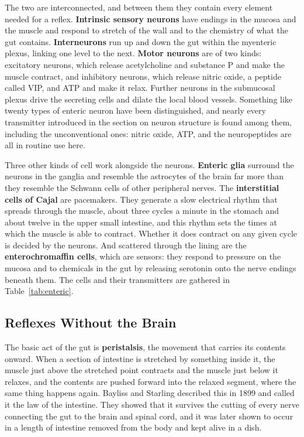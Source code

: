 \documentclass[11pt]{article}
\begin{document}
The two are interconnected, and between them they contain every element needed for a reflex. \textbf{Intrinsic sensory neurons} have endings in the mucosa and the muscle and respond to stretch of the wall and to the chemistry of what the gut contains. \textbf{Interneurons} run up and down the gut within the myenteric plexus, linking one level to the next. \textbf{Motor neurons} are of two kinds: excitatory neurons, which release acetylcholine and substance P and make the muscle contract, and inhibitory neurons, which release nitric oxide, a peptide called VIP, and ATP and make it relax. Further neurons in the submucosal plexus drive the secreting cells and dilate the local blood vessels. Something like twenty types of enteric neuron have been distinguished, and nearly every transmitter introduced in the section on neuron structure is found among them, including the unconventional ones: nitric oxide, ATP, and the neuropeptides are all in routine use here.

Three other kinds of cell work alongside the neurons. \textbf{Enteric glia} surround the neurons in the ganglia and resemble the astrocytes of the brain far more than they resemble the Schwann cells of other peripheral nerves. The \textbf{interstitial cells of Cajal} are pacemakers. They generate a slow electrical rhythm that spreads through the muscle, about three cycles a minute in the stomach and about twelve in the upper small intestine, and this rhythm sets the times at which the muscle is able to contract. Whether it does contract on any given cycle is decided by the neurons. And scattered through the lining are the \textbf{enterochromaffin cells}, which are sensors: they respond to pressure on the mucosa and to chemicals in the gut by releasing serotonin onto the nerve endings beneath them. The cells and their transmitters are gathered in Table~\ref{tab:enteric}.

\subsection{Reflexes Without the Brain}

The basic act of the gut is \textbf{peristalsis}, the movement that carries its contents onward. When a section of intestine is stretched by something inside it, the muscle just above the stretched point contracts and the muscle just below it relaxes, and the contents are pushed forward into the relaxed segment, where the same thing happens again. Bayliss and Starling described this in 1899 and called it the law of the intestine. They showed that it survives the cutting of every nerve connecting the gut to the brain and spinal cord, and it was later shown to occur in a length of intestine removed from the body and kept alive in a dish.
\end{document}
